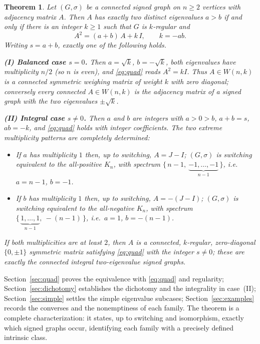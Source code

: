 \documentclass{amsart}
\newtheorem{theorem}{Theorem}
\theoremstyle{definition}
\begin{document}
\begin{theorem}\label{thm:main}
Let $(G,\sigma)$ be a connected signed graph on $n\ge 2$ vertices with
adjacency matrix $A$. Then $A$ has exactly two distinct eigenvalues $a>b$ if
and only if there is an integer $k\ge1$ such that $G$ is $k$-regular and
\begin{equation}\label{eq:quad}
A^2=(a+b)\,A+k\,I,\qquad k=-ab .
\end{equation}
Writing $s=a+b$, exactly one of the following holds.

\smallskip
\textbf{(I) Balanced case $s=0$.}
Then $a=\sqrt k$, $b=-\sqrt k$, both eigenvalues have multiplicity $n/2$ (so
$n$ is even), and \eqref{eq:quad} reads $A^2=kI$. Thus $A\in W(n,k)$ is a
connected symmetric weighing matrix of weight $k$ with zero diagonal;
conversely every connected $A\in W(n,k)$ is the adjacency matrix of a signed
graph with the two eigenvalues $\pm\sqrt k$.

\smallskip
\textbf{(II) Integral case $s\ne 0$.}
Then $a$ and $b$ are integers with $a>0>b$, $a+b=s$, $ab=-k$, and
\eqref{eq:quad} holds with integer coefficients. The two extreme multiplicity
patterns are completely determined:
\begin{itemize}
\item[(IIa)] If $a$ has multiplicity $1$ then, up to switching, $A=J-I$;
$(G,\sigma)$ is switching equivalent to the all-positive $K_n$, with spectrum
$\{\,n-1,\ \underbrace{-1,\dots,-1}_{n-1}\,\}$, i.e.\ $a=n-1$, $b=-1$.
\item[(IIb)] If $b$ has multiplicity $1$ then, up to switching, $A=-(J-I)$;
$(G,\sigma)$ is switching equivalent to the all-negative $K_n$, with spectrum
$\{\,\underbrace{1,\dots,1}_{n-1},\ -(n-1)\,\}$, i.e.\ $a=1$, $b=-(n-1)$.
\end{itemize}
If both multiplicities are at least $2$, then $A$ is a connected, $k$-regular,
zero-diagonal $\{0,\pm1\}$ symmetric matrix satisfying \eqref{eq:quad} with the
integer $s\ne0$; these are exactly the connected integral two-eigenvalue signed
graphs.
\end{theorem}

Section~\ref{sec:quad} proves the equivalence with \eqref{eq:quad} and
regularity; Section~\ref{sec:dichotomy} establishes the dichotomy and the
integrality in case~(II); Section~\ref{sec:simple} settles the simple
eigenvalue subcases; Section~\ref{sec:examples} records the converses and the
nonemptiness of each family. The theorem is a complete characterization: it
states, up to switching and isomorphism, exactly which signed graphs occur,
identifying each family with a precisely defined intrinsic class.
\end{document}
